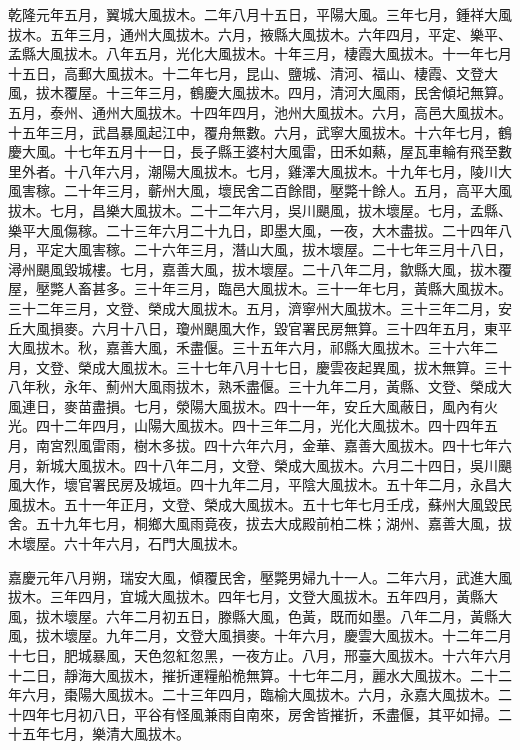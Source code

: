 \begin{pinyinscope}
乾隆元年五月，翼城大風拔木。二年八月十五日，平陽大風。三年七月，鍾祥大風拔木。五年三月，通州大風拔木。六月，掖縣大風拔木。六年四月，平定、樂平、孟縣大風拔木。八年五月，光化大風拔木。十年三月，棲霞大風拔木。十一年七月十五日，高郵大風拔木。十二年七月，昆山、鹽城、清河、福山、棲霞、文登大風，拔木覆屋。十三年三月，鶴慶大風拔木。四月，清河大風雨，民舍傾圮無算。五月，泰州、通州大風拔木。十四年四月，池州大風拔木。六月，高邑大風拔木。十五年三月，武昌暴風起江中，覆舟無數。六月，武寧大風拔木。十六年七月，鶴慶大風。十七年五月十一日，長子縣王婆村大風雷，田禾如爇，屋瓦車輪有飛至數里外者。十八年六月，潮陽大風拔木。七月，雞澤大風拔木。十九年七月，陵川大風害稼。二十年三月，蘄州大風，壞民舍二百餘間，壓斃十餘人。五月，高平大風拔木。七月，昌樂大風拔木。二十二年六月，吳川颶風，拔木壞屋。七月，孟縣、樂平大風傷稼。二十三年六月二十九日，即墨大風，一夜，大木盡拔。二十四年八月，平定大風害稼。二十六年三月，潛山大風，拔木壞屋。二十七年三月十八日，潯州颶風毀城樓。七月，嘉善大風，拔木壞屋。二十八年二月，歙縣大風，拔木覆屋，壓斃人畜甚多。三十年三月，臨邑大風拔木。三十一年七月，黃縣大風拔木。三十二年三月，文登、榮成大風拔木。五月，濟寧州大風拔木。三十三年二月，安丘大風損麥。六月十八日，瓊州颶風大作，毀官署民房無算。三十四年五月，東平大風拔木。秋，嘉善大風，禾盡偃。三十五年六月，祁縣大風拔木。三十六年二月，文登、榮成大風拔木。三十七年八月十七日，慶雲夜起異風，拔木無算。三十八年秋，永年、薊州大風雨拔木，熟禾盡偃。三十九年二月，黃縣、文登、榮成大風連日，麥苗盡損。七月，滎陽大風拔木。四十一年，安丘大風蔽日，風內有火光。四十二年四月，山陽大風拔木。四十三年二月，光化大風拔木。四十四年五月，南宮烈風雷雨，樹木多拔。四十六年六月，金華、嘉善大風拔木。四十七年六月，新城大風拔木。四十八年二月，文登、榮成大風拔木。六月二十四日，吳川颶風大作，壞官署民房及城垣。四十九年二月，平陰大風拔木。五十年二月，永昌大風拔木。五十一年正月，文登、榮成大風拔木。五十七年七月壬戌，蘇州大風毀民舍。五十九年七月，桐鄉大風雨竟夜，拔去大成殿前柏二株；湖州、嘉善大風，拔木壞屋。六十年六月，石門大風拔木。

嘉慶元年八月朔，瑞安大風，傾覆民舍，壓斃男婦九十一人。二年六月，武進大風拔木。三年四月，宜城大風拔木。四年七月，文登大風拔木。五年四月，黃縣大風，拔木壞屋。六年二月初五日，滕縣大風，色黃，既而如墨。八年二月，黃縣大風，拔木壞屋。九年二月，文登大風損麥。十年六月，慶雲大風拔木。十二年二月十七日，肥城暴風，天色忽紅忽黑，一夜方止。八月，邢臺大風拔木。十六年六月十二日，靜海大風拔木，摧折運糧船桅無算。十七年二月，麗水大風拔木。二十二年六月，棗陽大風拔木。二十三年四月，臨榆大風拔木。六月，永嘉大風拔木。二十四年七月初八日，平谷有怪風兼雨自南來，房舍皆摧折，禾盡偃，其平如掃。二十五年七月，樂清大風拔木。


\end{pinyinscope}
